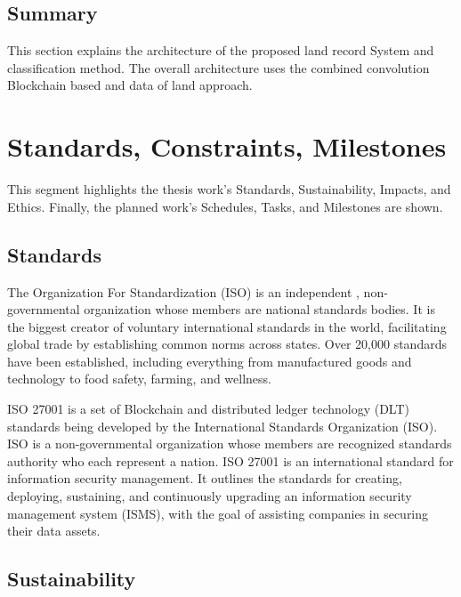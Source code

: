 \documentclass[12pt]{ucthesis}
\begin{document}
\vspace{-2mm}

\section{Summary}
    This section explains the architecture of the proposed land record System and classification method. The overall architecture uses the combined convolution Blockchain based and data of land approach.
    
 

\chapter{Standards, Constraints, Milestones}
\label{standardsandchallanges}

This segment highlights the thesis work's Standards,  Sustainability, Impacts, and Ethics. Finally, the planned work's Schedules, Tasks, and Milestones are shown.
\section{Standards}
\label{Sustainability}
The Organization For Standardization (ISO) is an independent , non-governmental organization whose members are national standards bodies. It is the biggest creator of voluntary international standards in the world, facilitating global trade by establishing common norms across states. Over 20,000 standards have been established, including everything from manufactured goods and technology to food safety, farming, and wellness. 

ISO 27001 is a set of Blockchain and distributed ledger technology (DLT) standards being developed by the International Standards Organization (ISO). ISO is a non-governmental organization whose members are recognized standards authority who each represent a nation. ISO 27001 is an international standard for information security management. It outlines the standards for creating, deploying, sustaining, and continuously upgrading an information security management system (ISMS), with the goal of assisting companies in securing their data assets.

\section{Sustainability}
\end{document}
